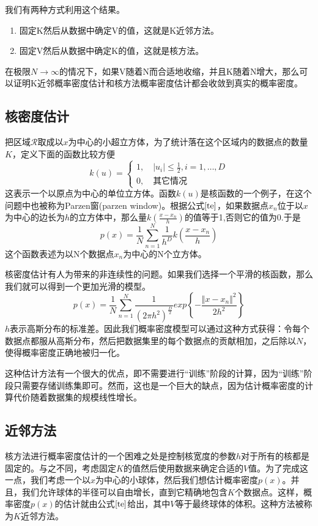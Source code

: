 我们有两种方式利用这个结果。
\begin{enumerate}
	\item 固定K然后从数据中确定V的值，这就是K近邻方法。
	\item 固定V然后从数据中确定K的值，这就是核方法。
\end{enumerate}
在极限$N\to \infty$的情况下，如果V随着N而合适地收缩，并且K随着N增大，那么可以证明K近邻概率密度估计和核方法概率密度估计都会收敛到真实的概率密度。
\subsection*{核密度估计}
把区域$\mathcal{R}$取成以$x$为中心的小超立方体，为了统计落在这个区域内的数据点的数量$K$，定义下面的函数比较方便
\begin{equation}
\label{te}
	k(u)=\begin{cases}
	1,\quad |u_i|\leqslant \frac{1}{2},i=1,\dots,D\\
	0,\quad \text{其它情况}
	\end{cases}
\end{equation}
这表示一个以原点为中心的单位立方体。函数$k(u)$是核函数的一个例子，在这个问题中也被称为Parzen窗(parzen window)。根据公式$\ref{te}$，如果数据点$x_n$位于以$x$为中心的边长为$h$的立方体中，那么量$k(\frac{x-x_n}{h})$的值等于1,否则它的值为0.于是
\begin{equation}
	p(x)=\frac{1}{N}\sum_{n=1}^{N}\frac{1}{h^D}k\left(\frac{x-x_n}{h} \right)
\end{equation}
这个函数表述为以N个数据点$x_n$为中心的N个立方体。

核密度估计有人为带来的非连续性的问题。如果我们选择一个平滑的核函数，那么我们就可以得到一个更加光滑的模型。
\begin{equation}
	p(x)=\frac{1}{N}\sum_{n=1}^{N}\frac{1}{(2\pi h^2)^{\frac{D}{2}}}exp\left\{-\frac{\Vert x-x_n\Vert^2}{2h^2} \right\}
\end{equation}
$h$表示高斯分布的标准差。因此我们概率密度模型可以通过这种方式获得：令每个数据点都服从高斯分布，然后把数据集里的每个数据点的贡献相加，之后除以$N$，使得概率密度正确地被归一化。

这种估计方法有一个很大的优点，即不需要进行“训练”阶段的计算，因为“训练”阶段只需要存储训练集即可。然而，这也是一个巨大的缺点，因为估计概率密度的计算代价随着数据集的规模线性增长。
\subsection*{近邻方法}
核方法进行概率密度估计的一个困难之处是控制核宽度的参数$h$对于所有的核都是固定的。与之不同，考虑固定$K$的值然后使用数据来确定合适的$V$值。为了完成这一点，我们考虑一个以$x$为中心的小球体，然后我们想估计概率密度$p(x)$。并且，我们允许球体的半径可以自由增长，直到它精确地包含$K$个数据点。这样，概率密度$p(x)$的估计就由公式$\ref{te}$给出，其中$V$等于最终球体的体积。这种方法被称为$K$近邻方法。
